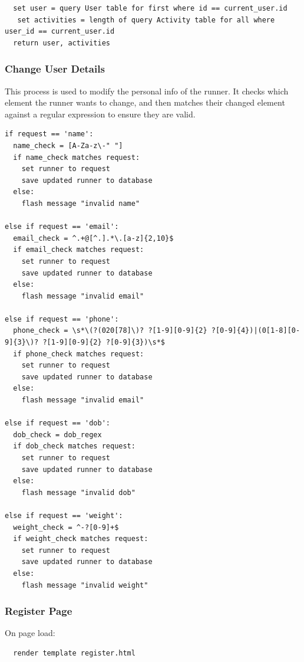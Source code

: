 \documentclass{article}[12pt,a4paper]
\begin{document}
\begin{verbatim}
  set user = query User table for first where id == current_user.id
   set activities = length of query Activity table for all where user_id == current_user.id
  return user, activities
\end{verbatim}

\subsubsection{Change User Details}
This process is used to modify the personal info of the runner. It checks which element the runner wants to change, and then matches their changed element against a regular expression to ensure they are valid. 

\begin{verbatim}
if request == 'name':
  name_check = [A-Za-z\-" "]
  if name_check matches request:
    set runner to request
    save updated runner to database
  else:
    flash message "invalid name"

else if request == 'email':
  email_check = ^.+@[^.].*\.[a-z]{2,10}$
  if email_check matches request:
    set runner to request
    save updated runner to database
  else:
    flash message "invalid email"

else if request == 'phone':
  phone_check = \s*\(?(020[78]\)? ?[1-9][0-9]{2} ?[0-9]{4})|(0[1-8][0-9]{3}\)? ?[1-9][0-9]{2} ?[0-9]{3})\s*$
  if phone_check matches request:
    set runner to request
    save updated runner to database
  else:
    flash message "invalid email"

else if request == 'dob':
  dob_check = dob_regex
  if dob_check matches request:
    set runner to request
    save updated runner to database
  else:
    flash message "invalid dob"

else if request == 'weight':
  weight_check = ^-?[0-9]+$
  if weight_check matches request:
    set runner to request
    save updated runner to database
  else:
    flash message "invalid weight"
\end{verbatim}

\subsubsection{Register Page}
On page load:
\begin{verbatim}
  render template register.html
\end{verbatim}
\end{document}
